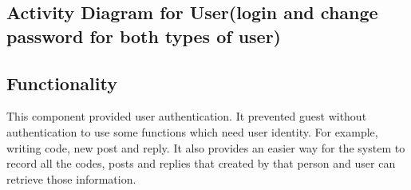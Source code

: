 \subsection{Activity Diagram for User(login and change password for both types of user)}
\begin{figure}[H]
 \label{5}
 \end{figure}

\subsection{Functionality}
This component provided user authentication. It prevented guest without authentication to use some functions which need user identity. For example, writing code, new post and reply. It also provides an easier way for the system to record all the codes, posts and replies that created by that person and user can retrieve those information.\newline

